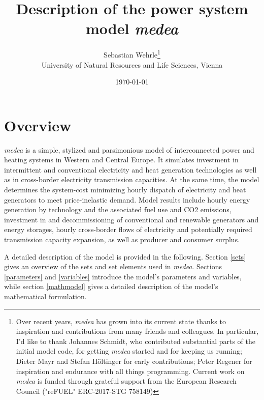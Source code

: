 \documentclass[11pt,a4paper]{article}
\title{Description of the power system model \emph{medea}}
\date{\today}
\author{Sebastian Wehrle\thanks{Over recent years, \emph{medea} has grown into its current state thanks to inspiration and contributions from many friends and colleagues. 
In particular, I'd like to thank Johannes Schmidt, who contributed substantial parts of the initial model code, for getting \emph{medea} started and for keeping us running; Dieter Mayr and Stefan Höltinger for early contributions; Peter Regener for inspiration and endurance with all things programming. Current work on \emph{medea} is funded through grateful support from the European Research Council ("reFUEL" ERC-2017-STG 758149)} \\University of Natural Resources and Life Sciences, Vienna}
\begin{document}
\maketitle
\section{Overview}
\emph{medea} is a simple, stylized and parsimonious model of interconnected power and heating systems in Western and Central Europe.
It simulates investment in intermittent and conventional electricity and heat generation technologies as well as in cross-border electricity transmission capacities.
At the same time, the model determines the system-cost minimizing hourly dispatch of electricity and heat generators to meet price-inelastic demand.
Model results include hourly energy generation by technology and the associated fuel use and CO2 emissions, investment in and decommissioning of conventional and renewable generators and energy storages, hourly cross-border flows of electricity and potentially required transmission capacity expansion, as well as producer and consumer surplus.

A detailed description of the model is provided in the following. Section \ref{sets} gives an overview of the sets and set elements used in \emph{medea}. Sections \ref{parameters} and \ref{variables} introduce the model's parameters and variables, while section \ref{mathmodel} gives a detailed description of the model's mathematical formulation.

\newpage
\end{document}
